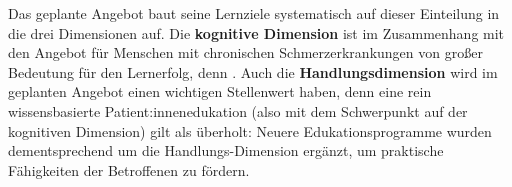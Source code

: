 \documentclass[
  twoside,
  parskip=half-,
  paper=176mm:246mm,
  BCOR=14mm,
  DIV=14,
]{scrreprt}
\begin{document}
 \begin{praxis}
Das geplante Angebot baut seine Lernziele systematisch auf dieser Einteilung in die drei Dimensionen auf. Die \textbf{kognitive Dimension} ist im Zusammenhang mit den Angebot für Menschen mit chronischen Schmerzerkrankungen von großer Bedeutung für den Lernerfolg, denn . Auch die \textbf{Handlungsdimension} wird im geplanten Angebot einen wichtigen Stellenwert haben, denn eine rein wissensbasierte Patient:innenedukation (also mit dem Schwerpunkt auf der kognitiven Dimension) gilt als überholt: Neuere Edukationsprogramme wurden dementsprechend um die Handlungs-Dimension ergänzt, um praktische Fähigkeiten der Betroffenen zu fördern. 


\end{praxis}
\end{document}
